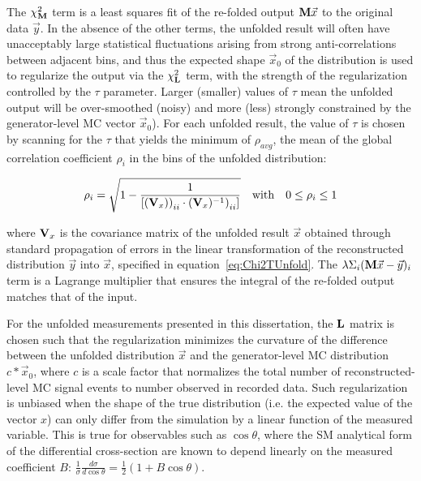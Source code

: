 The $\chi^{2}_{\mathbf{M}}$ term is a least squares fit of the re-folded output $\mathbf{M}\vec{x}$ to the original data $\vec{y}$.
In the absence of the other terms, the unfolded result will often have unacceptably large statistical fluctuations arising from strong anti-correlations between adjacent bins, and thus the expected shape $\vec{x}_{0}$ of the distribution is used to regularize the output via the $\chi^{2}_{\mathbf{L}}$ term, with the strength of the regularization controlled by the $\tau$ parameter. 
Larger (smaller) values of $\tau$ mean the unfolded output will be over-smoothed (noisy) and more (less) strongly constrained by the generator-level MC vector $\vec{x}_{0}$).
For each unfolded result, the value of $\tau$ is chosen by scanning for the $\tau$ that yields the minimum of $\rho_{avg}$, the mean of the global correlation coefficient $\rho_{i}$ in the bins of the unfolded distribution:
\begin{linenomath*}
\begin{align}
\rho_{i} = \sqrt{1 - \frac{1}{[{(\mathbf{V}_{x}))}_{ii} \cdot {(\mathbf{V}_{x})^{-1})}_{ii}]}} \quad \text{with} \quad 0 \leq \rho_{i} \leq 1
\end{align}
\end{linenomath*}
where $\mathbf{V}_{x}$ is the covariance matrix of the unfolded result $\vec{x}$ obtained through standard propagation of errors in the linear transformation of the reconstructed distribution $\vec{y}$ into $\vec{x}$, specified in equation~\ref{eq:Chi2TUnfold}.
The $\lambda\Sigma_{i}(\mathbf{M}\vec{x}-\vec{y})_{i}$ term is a Lagrange multiplier that ensures the integral of the re-folded output matches that of the input.

For the unfolded measurements presented in this dissertation, the $\mathbf{L}$ matrix is chosen such that the regularization minimizes the curvature of the difference between the unfolded distribution $\vec{x}$ and the generator-level MC distribution $c*\vec{x}_{0}$, where $c$ is a scale factor that normalizes the total number of reconstructed-level MC signal events to number observed in recorded data.
Such regularization is unbiased when the shape of the true distribution (i.e. the expected value of the vector $x$) can only differ from the simulation by a linear function of the measured variable. This is true for observables such as $\cos\theta$, where the SM analytical form of the differential cross-section are known to depend linearly on the measured coefficient $B$: $\tfrac{1}{\sigma}\tfrac{d\sigma}{d\cos\theta} = \tfrac{1}{2} (1+B \cos\theta)$. 


